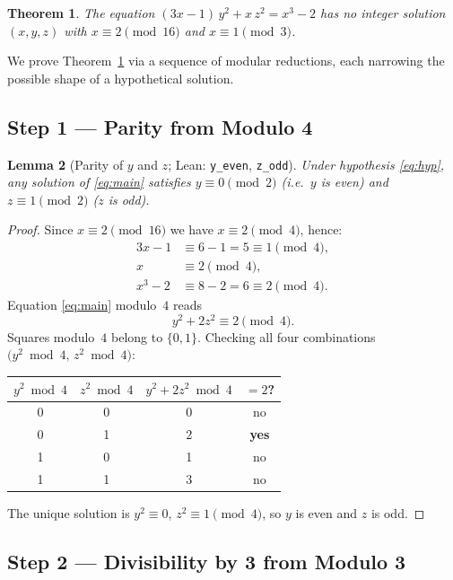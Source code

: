 \documentclass[12pt,a4paper]{article}
\newtheorem{theorem}{Theorem}
\newtheorem{lemma}[theorem]{Lemma}
\begin{document}
\begin{theorem}\label{thm:main}
The equation $(3x-1)\,y^2 + x\,z^2 = x^3 - 2$ has no integer solution
$(x,y,z)$ with $x \equiv 2 \pmod{16}$ and $x \equiv 1 \pmod{3}$.
\end{theorem}

We prove Theorem~\ref{thm:main} via a sequence of modular reductions,
each narrowing the possible shape of a hypothetical solution.

\subsection{Step 1 --- Parity from Modulo 4}

\begin{lemma}[Parity of $y$ and $z$; Lean: \texttt{y\_even}, \texttt{z\_odd}]\label{lem:parity}
Under hypothesis \eqref{eq:hyp}, any solution of \eqref{eq:main} satisfies
$y \equiv 0 \pmod 2$ (i.e.\ $y$ is even) and $z \equiv 1 \pmod 2$ ($z$ is
odd).
\end{lemma}

\begin{proof}
Since $x \equiv 2 \pmod{16}$ we have $x \equiv 2 \pmod 4$, hence:
\begin{align*}
  3x-1 &\equiv 6-1 = 5 \equiv 1 \pmod 4,\\
  x     &\equiv 2 \pmod 4,\\
  x^3-2 &\equiv 8-2 = 6 \equiv 2 \pmod 4.
\end{align*}
Equation \eqref{eq:main} modulo~$4$ reads
\[
  y^2 + 2z^2 \equiv 2 \pmod 4.
\]
Squares modulo~$4$ belong to $\{0,1\}$. Checking all four combinations
$\bigl(y^2 \bmod 4,\, z^2 \bmod 4\bigr)$:
\begin{center}
\begin{tabular}{cc|c|c}
  $y^2\bmod4$ & $z^2\bmod4$ & $y^2+2z^2\bmod4$ & $= 2$? \\
  \hline
  0 & 0 & 0 & no \\
  0 & 1 & 2 & \textbf{yes} \\
  1 & 0 & 1 & no \\
  1 & 1 & 3 & no \\
\end{tabular}
\end{center}
The unique solution is $y^2 \equiv 0$, $z^2 \equiv 1 \pmod 4$, so $y$ is
even and $z$ is odd.
\end{proof}

\subsection{Step 2 --- Divisibility by 3 from Modulo 3}
\end{document}
